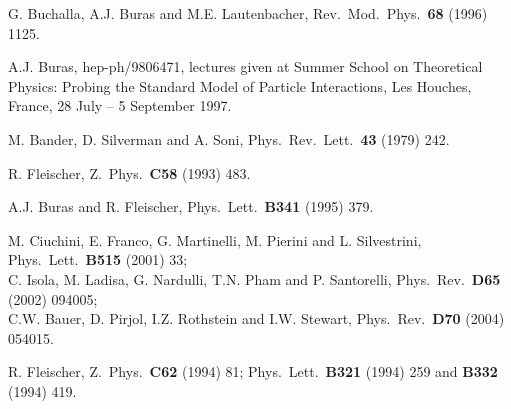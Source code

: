 \documentclass[12pt]{article}
\begin{document}
\begin{thebibliography}{999}
G. Buchalla, A.J. Buras and M.E. Lautenbacher,
{ Rev.\ Mod.\ Phys.}~{\bf 68} (1996) 1125.
  
A.J. Buras, hep-ph/9806471, lectures given at 
Summer School on Theoretical Physics: Probing the Standard Model of 
Particle Interactions, Les Houches, France, 28 July -- 5 September 1997.

M. Bander, D. Silverman and A. Soni,
{ Phys.\ Rev.\ Lett.}~{\bf 43} (1979) 242.

R. Fleischer,
{ Z.\ Phys.}~{\bf C58} (1993) 483.

A.J. Buras and R. Fleischer,
{ Phys.\ Lett.}~{\bf B341} (1995) 379.

M. Ciuchini, E. Franco, G. Martinelli, M. Pierini 
and L. Silvestrini,
{ Phys.\ Lett.}~{\bf B515} (2001) 33;\\
C. Isola, M. Ladisa, G. Nardulli, T.N. Pham and P. Santorelli,
{ Phys.\ Rev.}~{\bf D65} (2002) 094005;\\
C.W. Bauer, D. Pirjol, I.Z. Rothstein and I.W. Stewart,
Phys.\ Rev.\  {\bf D70} (2004) 054015.

R. Fleischer,
{ Z.\ Phys.}~{\bf C62} (1994) 81;
{ Phys.\ Lett.}~{\bf B321} (1994) 259 and
{\bf B332} (1994) 419.


\end{thebibliography}
\end{document}
